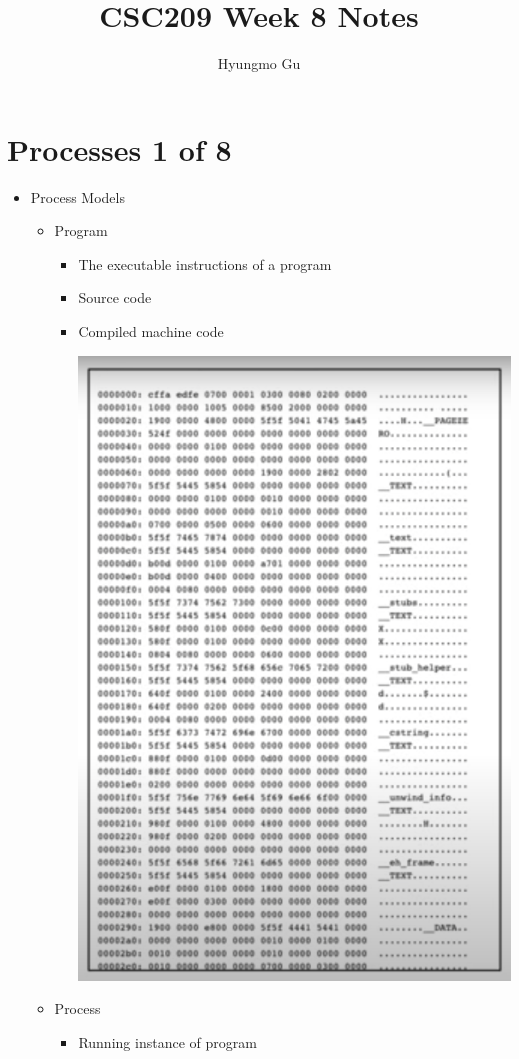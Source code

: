\documentclass[12pt]{article}
\begin{document}
\title{CSC209 Week 8 Notes}
\author{Hyungmo Gu}
\maketitle

\section*{Processes 1 of 8}

\bigskip

\begin{itemize}
    \item Process Models
    \begin{itemize}
        \item Program
        \begin{itemize}
            \item The executable instructions of a program
            \item Source code
            \item Compiled machine code

            \begin{center}
            \includegraphics[width=0.5\linewidth]{images/week_8_notes_1_1.png}
            \end{center}

        \end{itemize}
        \item Process
        \begin{itemize}
            \item Running instance of program
        \end{itemize}


\end{itemize}
\end{itemize}
\end{document}
